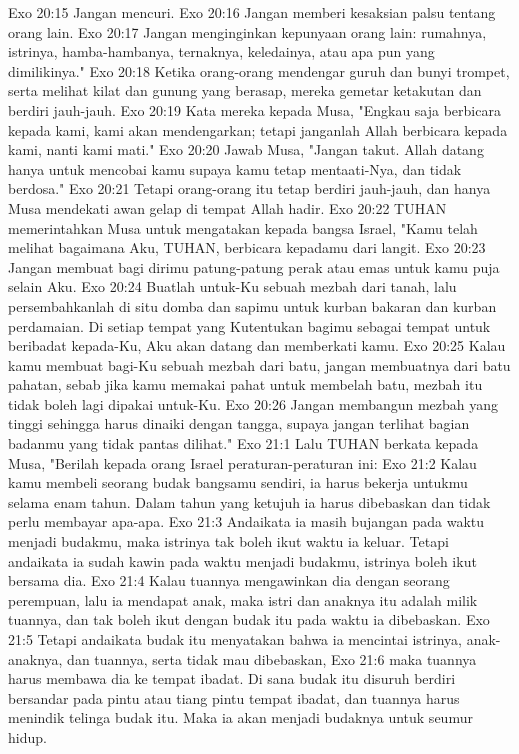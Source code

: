 Exo 20:15  Jangan mencuri.
Exo 20:16  Jangan memberi kesaksian palsu tentang orang lain.
Exo 20:17  Jangan menginginkan kepunyaan orang lain: rumahnya, istrinya, hamba-hambanya, ternaknya, keledainya, atau apa pun yang dimilikinya."
Exo 20:18  Ketika orang-orang mendengar guruh dan bunyi trompet, serta melihat kilat dan gunung yang berasap, mereka gemetar ketakutan dan berdiri jauh-jauh.
Exo 20:19  Kata mereka kepada Musa, "Engkau saja berbicara kepada kami, kami akan mendengarkan; tetapi janganlah Allah berbicara kepada kami, nanti kami mati."
Exo 20:20  Jawab Musa, "Jangan takut. Allah datang hanya untuk mencobai kamu supaya kamu tetap mentaati-Nya, dan tidak berdosa."
Exo 20:21  Tetapi orang-orang itu tetap berdiri jauh-jauh, dan hanya Musa mendekati awan gelap di tempat Allah hadir.
Exo 20:22  TUHAN memerintahkan Musa untuk mengatakan kepada bangsa Israel, "Kamu telah melihat bagaimana Aku, TUHAN, berbicara kepadamu dari langit.
Exo 20:23  Jangan membuat bagi dirimu patung-patung perak atau emas untuk kamu puja selain Aku.
Exo 20:24  Buatlah untuk-Ku sebuah mezbah dari tanah, lalu persembahkanlah di situ domba dan sapimu untuk kurban bakaran dan kurban perdamaian. Di setiap tempat yang Kutentukan bagimu sebagai tempat untuk beribadat kepada-Ku, Aku akan datang dan memberkati kamu.
Exo 20:25  Kalau kamu membuat bagi-Ku sebuah mezbah dari batu, jangan membuatnya dari batu pahatan, sebab jika kamu memakai pahat untuk membelah batu, mezbah itu tidak boleh lagi dipakai untuk-Ku.
Exo 20:26  Jangan membangun mezbah yang tinggi sehingga harus dinaiki dengan tangga, supaya jangan terlihat bagian badanmu yang tidak pantas dilihat."
Exo 21:1  Lalu TUHAN berkata kepada Musa, "Berilah kepada orang Israel peraturan-peraturan ini:
Exo 21:2  Kalau kamu membeli seorang budak bangsamu sendiri, ia harus bekerja untukmu selama enam tahun. Dalam tahun yang ketujuh ia harus dibebaskan dan tidak perlu membayar apa-apa.
Exo 21:3  Andaikata ia masih bujangan pada waktu menjadi budakmu, maka istrinya tak boleh ikut waktu ia keluar. Tetapi andaikata ia sudah kawin pada waktu menjadi budakmu, istrinya boleh ikut bersama dia.
Exo 21:4  Kalau tuannya mengawinkan dia dengan seorang perempuan, lalu ia mendapat anak, maka istri dan anaknya itu adalah milik tuannya, dan tak boleh ikut dengan budak itu pada waktu ia dibebaskan.
Exo 21:5  Tetapi andaikata budak itu menyatakan bahwa ia mencintai istrinya, anak-anaknya, dan tuannya, serta tidak mau dibebaskan,
Exo 21:6  maka tuannya harus membawa dia ke tempat ibadat. Di sana budak itu disuruh berdiri bersandar pada pintu atau tiang pintu tempat ibadat, dan tuannya harus menindik telinga budak itu. Maka ia akan menjadi budaknya untuk seumur hidup.
